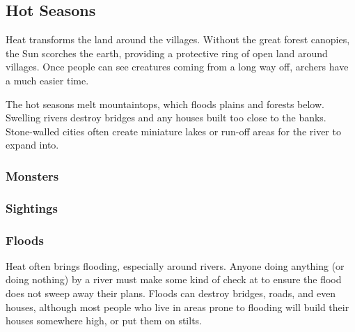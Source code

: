 \begin{multicols}{2}

\subsection{Hot Seasons}

\noindent
Heat transforms the land around the villages.
Without the great forest canopies, the Sun scorches the earth, providing a protective ring of open land around villages.
Once people can see creatures coming from a long way off, archers have a much easier time.

The hot seasons melt mountaintops, which floods plains and forests below.
Swelling rivers destroy bridges and any houses built too close to the banks.
Stone-walled cities often create miniature lakes or run-off areas for the river to expand into.

\setcounter{enc}{0}
\setcounter{track}{0}

\encWarmVillages

\encWarmEdge

\encWarmForest

\begin{multicols}{2}
\subsubsection*{Monsters}

\setcounter{enc}{4}
\begin{dlist}
\end{dlist}

\subsubsection*{Sightings}

\setcounter{track}{3}
\begin{dlist}
\end{dlist}

\end{multicols}

\subsubsection{Floods}

Heat often brings flooding, especially around rivers.
Anyone doing anything (or doing nothing) by a river must make some kind of check at \tn[8] to ensure the flood does not sweep away their plans.
Floods can destroy bridges, roads, and even houses, although most people who live in areas prone to flooding will build their houses somewhere high, or put them on stilts.


\end{multicols}
